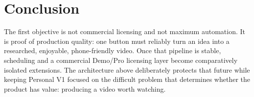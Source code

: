 \documentclass[10pt,journal,compsoc]{IEEEtran}
\begin{document}
\section{Conclusion}

The first objective is not commercial licensing and not maximum automation. It is proof of production quality: one button must reliably turn an idea into a researched, enjoyable, phone-friendly video. Once that pipeline is stable, scheduling and a commercial Demo/Pro licensing layer become comparatively isolated extensions. The architecture above deliberately protects that future while keeping Personal V1 focused on the difficult problem that determines whether the product has value: producing a video worth watching.
\end{document}
